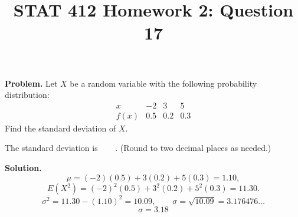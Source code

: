 \documentclass[11pt]{article}
\title{STAT 412 Homework 2: Question 17}
\author{}
\date{}
\begin{document}
\maketitle
\textbf{Problem.} Let \(X\) be a random variable with the following probability
distribution:
\[
\begin{array}{c|ccc}x&-2&3&5\\\hline
f(x)&0.5&0.2&0.3\end{array}
\]
Find the standard deviation of \(X\).

The standard deviation is \(\boxed{\phantom{0.00}}\). (Round to two decimal
places as needed.)

\textbf{Solution.}
\[
\mu=(-2)(0.5)+3(0.2)+5(0.3)=1.10,
\]
\[
E(X^2)=(-2)^2(0.5)+3^2(0.2)+5^2(0.3)=11.30.
\]
\[
\sigma^2=11.30-(1.10)^2=10.09,\qquad
\sigma=\sqrt{10.09}=3.176476\ldots
\]
\[
\boxed{\sigma=3.18}
\]
\end{document}
